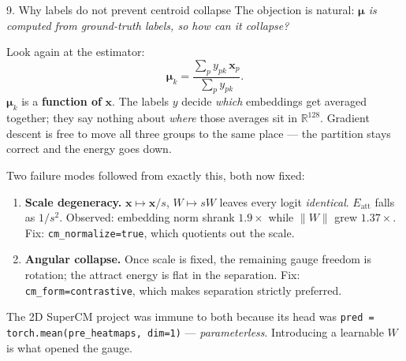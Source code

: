 \documentclass[10pt,aspectratio=169]{beamer}
\newcommand{\xv}{\mathbf{x}}
\newcommand{\muv}{\boldsymbol{\mu}}
\newcommand{\Rb}{\mathbb{R}}
\begin{document}
\begin{frame}{9. Why labels do not prevent centroid collapse}
\small
The objection is natural: \emph{$\muv$ is computed from ground-truth labels, so how can it collapse?}

\vspace{0.6em}
Look again at the estimator:
\[
  \muv_k = \frac{\sum_p y_{pk}\,\xv_p}{\sum_p y_{pk}}.
\]
$\muv_k$ is a \textbf{function of} $\xv$. The labels $y$ decide \emph{which} embeddings get averaged
together; they say nothing about \emph{where} those averages sit in $\Rb^{128}$. Gradient descent is free to
move all three groups to the same place --- the partition stays correct and the energy goes down.

\vspace{0.8em}
Two failure modes followed from exactly this, both now fixed:

\begin{enumerate}
\item \textbf{Scale degeneracy.} $\xv \mapsto \xv/s$, $W \mapsto sW$ leaves every logit \emph{identical}.
      $E_{\mathrm{att}}$ falls as $1/s^2$. Observed: embedding norm shrank $1.9\times$ while $\lVert W\rVert$
      grew $1.37\times$. \;Fix: \texttt{cm\_normalize=true}, which quotients out the scale.
\item \textbf{Angular collapse.} Once scale is fixed, the remaining gauge freedom is rotation; the attract
      energy is flat in the separation. \;Fix: \texttt{cm\_form=contrastive}, which makes separation strictly
      preferred.
\end{enumerate}

\vspace{0.6em}
The 2D SuperCM project was immune to both because its head was
\texttt{pred = torch.mean(pre\_heatmaps, dim=1)} --- \emph{parameterless}. Introducing a learnable $W$ is what
opened the gauge.
\end{frame}
\end{document}
